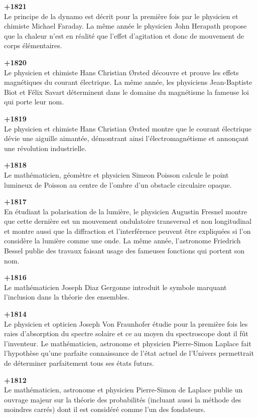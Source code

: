 \textbf{+1821}\\
Le principe de la dynamo est décrit pour la première fois par le physicien et chimiste Michael Faraday. La même année le physicien John Herapath propose que la chaleur n'est en réalité que l'effet d'agitation et donc de mouvement de corps élémentaires.

\textbf{+1820}\\
Le physicien et chimiste Hans Christian Ørsted découvre et prouve les effets magnétiques du courant électrique. La même année, les physiciens Jean-Baptiste Biot et Félix Savart déterminent dans le domaine du magnétisme la fameuse loi qui porte leur nom.

\textbf{+1819}\\
Le physicien et chimiste Hans Christian Ørsted montre que le courant électrique dévie une aiguille aimantée, démontrant ainsi l'électromagnétisme et annonçant une révolution industrielle.

\textbf{+1818}\\
Le mathématicien, géomètre et physicien Simeon Poisson calcule le point lumineux de Poisson au centre de l'ombre d'un obstacle circulaire opaque.

\textbf{+1817}\\
En étudiant la polarisation de la lumière, le physicien Augustin Fresnel montre que cette dernière est un mouvement ondulatoire transversal et non longitudinal et montre aussi que la diffraction et l'interférence peuvent être expliquées si l'on considère la lumière comme une onde. La même année, l'astronome Friedrich Bessel publie des travaux faisant usage des fameuses fonctions qui portent son nom.

\textbf{+1816}\\
Le mathématicien Joseph Diaz Gergonne introduit le symbole marquant l'inclusion dans la théorie des ensembles.

\textbf{+1814}\\
Le physicien et opticien Joseph Von Fraunhofer étudie pour la première fois les raies d'absorption du spectre solaire et ce au moyen du spectroscope dont il fût l'inventeur. Le mathématicien, astronome et physicien Pierre-Simon Laplace fait l'hypothèse qu'une parfaite connaissance de l'état actuel de l'Univers permettrait de déterminer parfaitement tous ses états futurs.

\textbf{+1812}\\
Le mathématicien, astronome et physicien Pierre-Simon de Laplace publie un ouvrage majeur sur la théorie des probabilités (incluant aussi la méthode des moindres carrés) dont il est considéré comme l'un des fondateurs.

